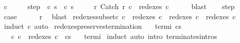 \begin{isabellebody}
\ c{\isacharprime}{\isacharprime}\ \isanewline
\ \ \ \ step{\isacharcolon}\ {\isachardoublequoteopen}{\isasymGamma}{\isasymturnstile}\ {\isacharparenleft}c{\isacharprime}{\isacharcomma}\ s{\isacharprime}{\isacharparenright}\ {\isasymrightarrow}\ {\isacharparenleft}c{\isacharprime}{\isacharprime}{\isacharcomma}\ s{\isacharprime}{\isacharprime}{\isacharparenright}{\isachardoublequoteclose}\ \isanewline
\ \ \ \ r{\isacharprime}{\isacharprime}{\isacharcolon}\ {\isachardoublequoteopen}Catch\ r{\isacharprime}{\isacharprime}\ c\ {\isasymin}\ redexes\ c{\isacharprime}{\isacharprime}{\isachardoublequoteclose}\isanewline
\ \ \ \ \isamarkupfalse%
\ blast\isanewline
\ \ \isamarkupfalse%
\ step\isanewline
\ \ \isamarkupfalse%
\ \isamarkupfalse%
\ {\isacharquery}case\isanewline
\ \ \ \ \isamarkupfalse%
\ r{\isacharprime}{\isacharprime}\ \isamarkupfalse%
\ blast\isanewline
{}\isamarkupfalse%
%
\endisatagproof
{\isafoldproof}%
%
\isadelimproof
\isanewline
%
\endisadelimproof
\isanewline
{}\isamarkupfalse%
\ redexes{\isacharunderscore}subset{\isacharcolon}{\isachardoublequoteopen}{\isasymAnd}c{\isacharprime}{\isachardot}\ c{\isacharprime}\ {\isasymin}\ redexes\ c\ {\isasymLongrightarrow}\ redexes\ c{\isacharprime}\ {\isasymsubseteq}\ redexes\ c{\isachardoublequoteclose}\isanewline
%
\isadelimproof
\ \ %
\endisadelimproof
%
\isatagproof
{}\isamarkupfalse%
\ {\isacharparenleft}induct\ c{\isacharparenright}\ auto%
\endisatagproof
{\isafoldproof}%
%
\isadelimproof
\isanewline
%
\endisadelimproof
\isanewline
{}\isamarkupfalse%
\ redexes{\isacharunderscore}preserves{\isacharunderscore}termination{\isacharcolon}\isanewline
\ \ \ termi{\isacharcolon}\ {\isachardoublequoteopen}{\isasymGamma}{\isasymturnstile}c{\isasymdown}s{\isachardoublequoteclose}\isanewline
\ \ \ {\isachardoublequoteopen}{\isasymAnd}c{\isacharprime}{\isachardot}\ c{\isacharprime}\ {\isasymin}\ redexes\ c\ {\isasymLongrightarrow}\ {\isasymGamma}{\isasymturnstile}c{\isacharprime}{\isasymdown}s{\isachardoublequoteclose}\ \ \isanewline
%
\isadelimproof
%
\endisadelimproof
%
\isatagproof
{}\isamarkupfalse%
\ termi\isanewline
{}\isamarkupfalse%
\ induct\ {\isacharparenleft}auto\ intro{\isacharcolon}\ terminates{\isachardot}intros{\isacharparenright}%
\endisatagproof
{\isafoldproof}%
%
\isadelimproof
\isanewline
%
\endisadelimproof
\isanewline
%
\isadelimtheory
\isanewline
%
\endisadelimtheory
%
\isatagtheory
{}\isamarkupfalse%
%
\endisatagtheory
{\isafoldtheory}%
%
\isadelimtheory
%
\endisadelimtheory
%
\end{isabellebody}%

